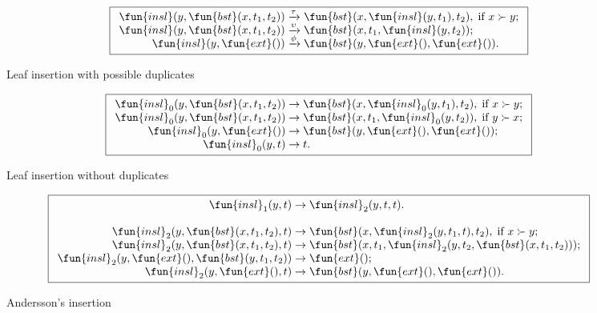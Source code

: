 \bigskip

\begin{figure}[h]
\begin{equation*}
\boxed{
\begin{array}{r@{\;}l@{\;}l}
\fun{insl}(y,\fun{bst}(x,t_1,t_2)) & \xrightarrow{\smash{\tau}} &
  \fun{bst}(x,\fun{insl}(y,t_1),t_2), \; \text{if \(x \succ y\)};\\
\fun{insl}(y,\fun{bst}(x,t_1,t_2)) & \xrightarrow{\smash{\upsilon}} &
  \fun{bst}(x,t_1,\fun{insl}(y,t_2));\\
\fun{insl}(y,\fun{ext}()) & \xrightarrow{\smash{\phi}} & \fun{bst}(y,\fun{ext}(),\fun{ext}()).
\end{array}}
\end{equation*}
\caption{Leaf insertion with possible duplicates}
\label{fig:insl}
\end{figure}

\bigskip

\begin{figure}[h]
\begin{equation*}
\boxed{
\begin{array}{r@{\;}l@{\;}l}
\fun{insl}_0(y,\fun{bst}(x,t_1,t_2)) & \rightarrow &
  \fun{bst}(x,\fun{insl}_0(y,t_1),t_2), \; \text{if \(x \succ y\)};\\
\fun{insl}_0(y,\fun{bst}(x,t_1,t_2)) & \rightarrow &
  \fun{bst}(x,t_1,\fun{insl}_0(y,t_2)) , \; \text{if \(y \succ x\)};\\
\fun{insl}_0(y,\fun{ext}()) & \rightarrow &
\fun{bst}(y,\fun{ext}(),\fun{ext}());\\
\fun{insl}_0(y,t) & \rightarrow & t.
\end{array}}
\end{equation*}
\caption{Leaf insertion without duplicates}
\label{fig:insl0}
\end{figure}

\begin{figure}
\begin{equation*}
\boxed{
\begin{array}{r@{\;}l@{\;}l}
\fun{insl}_1(y,t) & \rightarrow & \fun{insl}_2(y,t,t).\\
\\
\fun{insl}_2(y,\fun{bst}(x,t_1,t_2),t) & \rightarrow &
  \fun{bst}(x,\fun{insl}_2(y,t_1,t),t_2), \; \text{if \(x \succ y\)};\\
\fun{insl}_2(y,\fun{bst}(x,t_1,t_2),t) & \rightarrow &
  \fun{bst}(x,t_1,\fun{insl}_2(y,t_2,\fun{bst}(x,t_1,t_2)));\\
\fun{insl}_2(y,\fun{ext}(),\fun{bst}(y,t_1,t_2)) & \rightarrow & \fun{ext}();\\
\fun{insl}_2(y,\fun{ext}(),t) & \rightarrow & \fun{bst}(y,\fun{ext}(),\fun{ext}()).
\end{array}}
\end{equation*}
\caption{Andersson's insertion}
\label{fig:insl1}
\end{figure}

